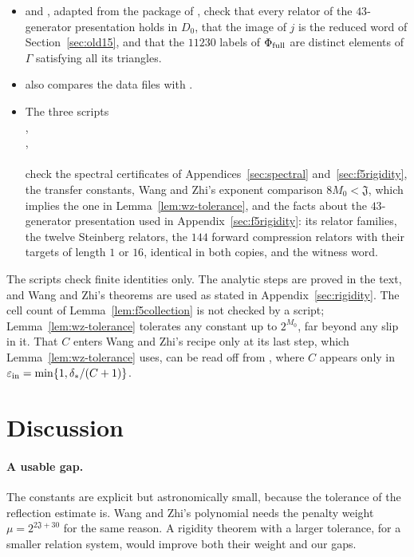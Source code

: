 \documentclass[11pt]{article}
\newcommand{\cJ}{\mathfrak J}
\begin{document}
\begin{itemize}
\item {} and , adapted from the package of \cite{MghirbiDouglasV1}, check that every relator of the $43$-generator presentation holds in $D_0$, that the image of $j$ is the reduced word of Section~\ref{sec:old15}, and that the $11230$ labels of $\Phi_{\rm full}$ are distinct elements of $\Gamma$ satisfying all its triangles.
\item {} also compares the data files with .
\item The three scripts\\ ,\\ ,\\ \\ check the spectral certificates of Appendices~\ref{sec:spectral} and~\ref{sec:f5rigidity}, the transfer constants, Wang and Zhi's exponent comparison $8M_0<\cJ$, which implies the one in Lemma~\ref{lem:wz-tolerance}, and the facts about the $43$-generator presentation used in Appendix~\ref{sec:f5rigidity}: its relator families, the twelve Steinberg relators, the $144$ forward compression relators with their targets of length $1$ or $16$, identical in both copies, and the witness word.
\end{itemize}
The scripts check finite identities only.  The analytic steps are proved in the text, and Wang and Zhi's theorems are used as stated in Appendix~\ref{sec:rigidity}.  The cell count of Lemma~\ref{lem:f5collection} is not checked by a script; Lemma~\ref{lem:wz-tolerance} tolerates any constant up to $2^{M_0}$, far beyond any slip in it.  That $C$ enters Wang and Zhi's recipe only at its last step, which Lemma~\ref{lem:wz-tolerance} uses, can be read off from \cite[(3.21)--(3.22)]{WangZhi26}, where $C$ appears only in $\varepsilon_{\rm in}=\min\{1,\delta_*/(C+1)\}$.

\section{Discussion}\label{sec:discussion}

\paragraph{A usable gap.}  The constants are explicit but astronomically small, because the tolerance of the reflection estimate is.  Wang and Zhi's polynomial needs the penalty weight $\mu=2^{2\cJ+30}$ \cite[(2.20)]{WangZhi26} for the same reason.  A rigidity theorem with a larger tolerance, for a smaller relation system, would improve both their weight and our gaps.
\end{document}

